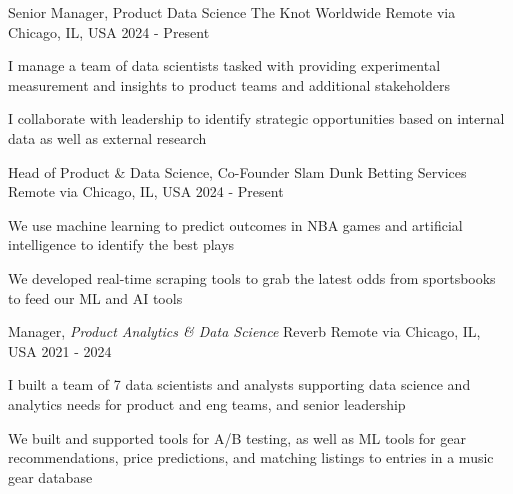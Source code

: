 
\begin{cventries}

  \cventry
    {Senior Manager, Product Data Science} %
    {The Knot Worldwide} %
    {Remote via Chicago, IL, USA} %
    {2024 - Present} %
    {
      \begin{cvitems}
        \item {I manage a team of data scientists tasked with providing experimental measurement and insights to product teams and additional stakeholders}
        \item {I collaborate with leadership to identify strategic opportunities based on internal data as well as external research}          
      \end{cvitems}
    }

  \cventry
    {Head of Product \& Data Science, Co-Founder} %
    {Slam Dunk Betting Services} %
    {Remote via Chicago, IL, USA} %
    {2024 - Present} %
    {
      \begin{cvitems}
        \item {We use machine learning to predict outcomes in NBA games and artificial intelligence to identify the best plays}
        \item {We developed real-time scraping tools to grab the latest odds from sportsbooks to feed our ML and AI tools}          
      \end{cvitems}
    }

  \cventry
    {Manager, \textit{Product Analytics \& Data Science}} %
    {Reverb} %
    {Remote via Chicago, IL, USA} %
    {2021 - 2024} %
    {
      \begin{cvitems}
        \item {I built a team of 7 data scientists and analysts supporting data science and analytics needs for product and eng teams, and senior leadership}
        \item {We built and supported tools for A/B testing, as well as ML tools for gear recommendations, price predictions, and matching listings to entries in a music gear database}  
      \end{cvitems}
    }


\end{cventries}
